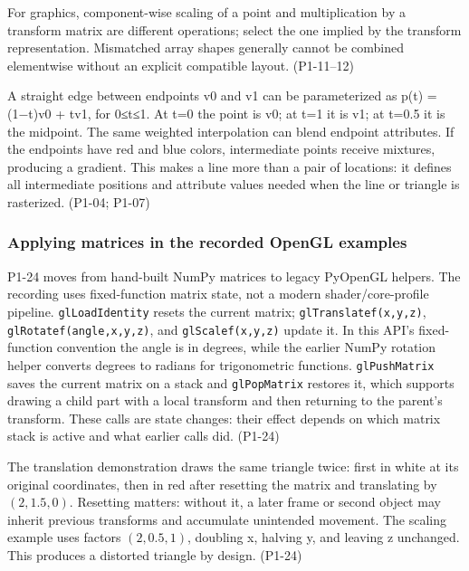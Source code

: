 For graphics, component-wise scaling of a point and multiplication by a transform matrix are different operations; select the one implied by the transform representation. Mismatched array shapes generally cannot be combined elementwise without an explicit compatible layout. (P1-11--12)

A straight edge between endpoints v0 and v1 can be parameterized as p(t) = (1−t)v0 + tv1, for 0≤t≤1. At t=0 the point is v0; at t=1 it is v1; at t=0.5 it is the midpoint. The same weighted interpolation can blend endpoint attributes. If the endpoints have red and blue colors, intermediate points receive mixtures, producing a gradient. This makes a line more than a pair of locations: it defines all intermediate positions and attribute values needed when the line or triangle is rasterized. (P1-04; P1-07)

\subsubsection{Applying matrices in the recorded OpenGL examples}\label{03-visual-computing-i-ch018-applying-matrices-in-the-recorded-opengl-examples}

\hypertarget{03-visual-computing-i-ch018-applying-matrices-in-the-recorded-opengl-examples}{}

P1-24 moves from hand-built NumPy matrices to legacy PyOpenGL helpers. The recording uses fixed-function matrix state, not a modern shader/core-profile pipeline. \texttt{glLoadIdentity} resets the current matrix; \texttt{glTranslatef(x,y,z)}, \texttt{glRotatef(angle,x,y,z)}, and \texttt{glScalef(x,y,z)} update it. In this API's fixed-function convention the angle is in degrees, while the earlier NumPy rotation helper converts degrees to radians for trigonometric functions. \texttt{glPushMatrix} saves the current matrix on a stack and \texttt{glPopMatrix} restores it, which supports drawing a child part with a local transform and then returning to the parent's transform. These calls are state changes: their effect depends on which matrix stack is active and what earlier calls did. (P1-24)

The translation demonstration draws the same triangle twice: first in white at its original coordinates, then in red after resetting the matrix and translating by \((2,1.5,0)\). Resetting matters: without it, a later frame or second object may inherit previous transforms and accumulate unintended movement. The scaling example uses factors \((2,0.5,1)\), doubling x, halving y, and leaving z unchanged. This produces a distorted triangle by design. (P1-24)

